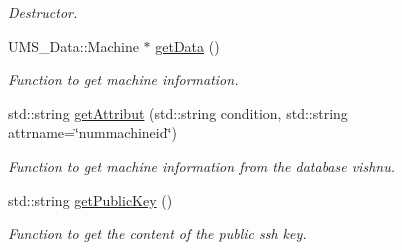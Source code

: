\begin{DoxyCompactItemize}
\begin{DoxyCompactList}\small\item\em Destructor. \item\end{DoxyCompactList}\item 
UMS\_\-Data::Machine $\ast$ \hyperlink{classMachineServer_a525e619128a0472920cf9894184f5b45}{getData} ()
\begin{DoxyCompactList}\small\item\em Function to get machine information. \item\end{DoxyCompactList}\item 
std::string \hyperlink{classMachineServer_a14afc6c4424dd26be8cc0843aac3f2f3}{getAttribut} (std::string condition, std::string attrname=\char`\"{}nummachineid\char`\"{})
\begin{DoxyCompactList}\small\item\em Function to get machine information from the database vishnu. \item\end{DoxyCompactList}\item 
std::string \hyperlink{classMachineServer_a75c136bdf1d210f19b5794f7c7ccd948}{getPublicKey} ()
\begin{DoxyCompactList}\small\item\em Function to get the content of the public ssh key. \item\end{DoxyCompactList}\end{DoxyCompactItemize}
